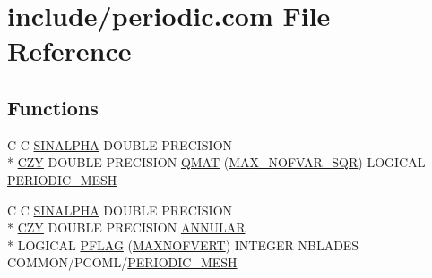 \hypertarget{home_2abonfi_2_c_f_d__codes_2_eul_f_s_83_84_2include_2periodic_8com}{\section{include/periodic.com File Reference}
\label{home_2abonfi_2_c_f_d__codes_2_eul_f_s_83_84_2include_2periodic_8com}
}
\subsection*{Functions}
\begin{DoxyCompactItemize}
\item 
C C \hyperlink{msa20_2home_2abonfi_2_c_f_d__codes_2_eul_f_s_83_82_83_2include_2periodic_8com_a97ced9baaec7d3d0578e199bfd823079}{S\-I\-N\-A\-L\-P\-H\-A} D\-O\-U\-B\-L\-E P\-R\-E\-C\-I\-S\-I\-O\-N \\*
\hyperlink{msa20_2home_2abonfi_2_c_f_d__codes_2_eul_f_s_83_82_83_2include_2periodic_8com_ad175bdbeeae72f2f20cdf0245e8a54a9}{C\-Z\-Y} D\-O\-U\-B\-L\-E P\-R\-E\-C\-I\-S\-I\-O\-N \hyperlink{home_2abonfi_2_c_f_d__codes_2_eul_f_s_83_84_2include_2periodic_8com_a6c6fc0d4d935035139f984a182d51c81}{Q\-M\-A\-T} (\hyperlink{msa20_2home_2abonfi_2_c_f_d__codes_2_eul_f_s_83_82_83_2include_2paramt_8h_a7655047f32c8c333f5412ebb47ac3e25}{M\-A\-X\-\_\-\-N\-O\-F\-V\-A\-R\-\_\-\-S\-Q\-R}) L\-O\-G\-I\-C\-A\-L \hyperlink{msa20_2home_2abonfi_2_c_f_d__codes_2_eul_f_s_83_82_83_2include_2periodic_8com_ac3a32540fe85c887d20996f79e007052}{P\-E\-R\-I\-O\-D\-I\-C\-\_\-\-M\-E\-S\-H}
\item 
C C \hyperlink{msa20_2home_2abonfi_2_c_f_d__codes_2_eul_f_s_83_82_83_2include_2periodic_8com_a97ced9baaec7d3d0578e199bfd823079}{S\-I\-N\-A\-L\-P\-H\-A} D\-O\-U\-B\-L\-E P\-R\-E\-C\-I\-S\-I\-O\-N \\*
\hyperlink{msa20_2home_2abonfi_2_c_f_d__codes_2_eul_f_s_83_82_83_2include_2periodic_8com_ad175bdbeeae72f2f20cdf0245e8a54a9}{C\-Z\-Y} D\-O\-U\-B\-L\-E P\-R\-E\-C\-I\-S\-I\-O\-N \hyperlink{msa20_2home_2abonfi_2_c_f_d__codes_2_eul_f_s_83_82_83_2include_2periodic_8com_aa6bf10e1571aac3f210a013ab517b524}{A\-N\-N\-U\-L\-A\-R} \\*
L\-O\-G\-I\-C\-A\-L \hyperlink{home_2abonfi_2_c_f_d__codes_2_eul_f_s_83_84_2include_2periodic_8com_a52cabf2f682fb4b41d02b41bd40dbea3}{P\-F\-L\-A\-G} (\hyperlink{msa20_2home_2abonfi_2_c_f_d__codes_2_eul_f_s_83_82_83_2include_2paramt_8h_ab61232bd83657eade2904454f444f477}{M\-A\-X\-N\-O\-F\-V\-E\-R\-T}) I\-N\-T\-E\-G\-E\-R N\-B\-L\-A\-D\-E\-S C\-O\-M\-M\-O\-N/P\-C\-O\-M\-L/\hyperlink{msa20_2home_2abonfi_2_c_f_d__codes_2_eul_f_s_83_82_83_2include_2periodic_8com_ac3a32540fe85c887d20996f79e007052}{P\-E\-R\-I\-O\-D\-I\-C\-\_\-\-M\-E\-S\-H}
\end{DoxyCompactItemize}
